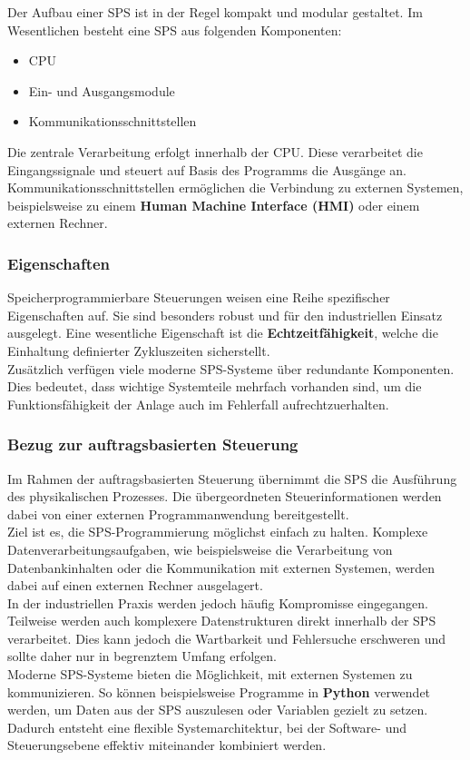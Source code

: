 Der Aufbau einer SPS ist in der Regel kompakt und modular gestaltet. Im Wesentlichen besteht eine SPS aus folgenden Komponenten\cite{Weyrich.2023}:
\begin{itemize}
	\item CPU
	\item Ein- und Ausgangsmodule
	\item Kommunikationsschnittstellen
\end{itemize}

Die zentrale Verarbeitung erfolgt innerhalb der CPU. Diese verarbeitet die Eingangssignale und steuert auf Basis des Programms die Ausgänge an. Kommunikationsschnittstellen ermöglichen die Verbindung zu externen Systemen, beispielsweise zu einem \textbf{Human Machine Interface (HMI)} oder einem externen Rechner.

\subsubsection{Eigenschaften}

Speicherprogrammierbare Steuerungen weisen eine Reihe spezifischer Eigenschaften auf. Sie sind besonders robust und für den industriellen Einsatz ausgelegt. Eine wesentliche Eigenschaft ist die \textbf{Echtzeitfähigkeit}, welche die Einhaltung definierter Zykluszeiten sicherstellt\Cite{Seitz.2021}.\\

Zusätzlich verfügen viele moderne SPS-Systeme über redundante Komponenten. Dies bedeutet, dass wichtige Systemteile mehrfach vorhanden sind, um die Funktionsfähigkeit der Anlage auch im Fehlerfall aufrechtzuerhalten\cite{Seitz.2021}.

\subsubsection{Bezug zur auftragsbasierten Steuerung}

Im Rahmen der auftragsbasierten Steuerung übernimmt die SPS die Ausführung des physikalischen Prozesses. Die übergeordneten Steuerinformationen werden dabei von einer externen Programmanwendung bereitgestellt.\\

Ziel ist es, die SPS-Programmierung möglichst einfach zu halten. Komplexe Datenverarbeitungsaufgaben, wie beispielsweise die Verarbeitung von Datenbankinhalten oder die Kommunikation mit externen Systemen, werden dabei auf einen externen Rechner ausgelagert.\\

In der industriellen Praxis werden jedoch häufig Kompromisse eingegangen. Teilweise werden auch komplexere Datenstrukturen direkt innerhalb der SPS verarbeitet. Dies kann jedoch die Wartbarkeit und Fehlersuche erschweren und sollte daher nur in begrenztem Umfang erfolgen.\\

Moderne SPS-Systeme bieten die Möglichkeit, mit externen Systemen zu kommunizieren. So können beispielsweise Programme in \textbf{Python} verwendet werden, um Daten aus der SPS auszulesen oder Variablen gezielt zu setzen. Dadurch entsteht eine flexible Systemarchitektur, bei der Software- und Steuerungsebene effektiv miteinander kombiniert werden\Cite{Langmann.2021}.